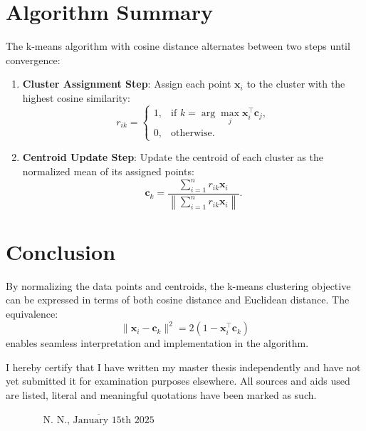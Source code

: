 \documentclass[12pt,twoside,a4paper,parskip]{scrbook} %
\def\BaAuthor{Bibin Babu}
\def\SubmitDate{January 15th 2025}
\def\ShowBaAuthor{\BaAuthor}
\def\ShowBaAuthor{N.~N.}
\begin{document}
\section*{Algorithm Summary}

The k-means algorithm with cosine distance alternates between two steps until convergence:

\begin{enumerate}
    \item \textbf{Cluster Assignment Step}: Assign each point \( \mathbf{x}_i \) to the cluster with the highest cosine similarity:
    \[
    r_{ik} =
    \begin{cases}
    1, & \text{if } k = \arg\max_{j} \mathbf{x}_i^\top \mathbf{c}_j, \\
    0, & \text{otherwise.}
    \end{cases}
    \]

    \item \textbf{Centroid Update Step}: Update the centroid of each cluster as the normalized mean of its assigned points:
    \[
    \mathbf{c}_k = \frac{\sum_{i=1}^{n} r_{ik} \mathbf{x}_i}{\left\| \sum_{i=1}^{n} r_{ik} \mathbf{x}_i \right\|}.
    \]
\end{enumerate}

\section*{Conclusion}

By normalizing the data points and centroids, the k-means clustering objective can be expressed in terms of both cosine distance and Euclidean distance. The equivalence:
\[
\|\mathbf{x}_i - \mathbf{c}_k\|^2 = 2(1 - \mathbf{x}_i^\top \mathbf{c}_k)
\]
enables seamless interpretation and implementation in the algorithm.

\cleardoublepage
{}
{}
\printbibliography


I hereby certify that I have written my master thesis independently and have not yet submitted it for examination purposes elsewhere. All sources and aids used are listed, literal and meaningful quotations have been marked as such.

\vspace{20pt}
\begin{flushright}
$\overline{~~~~~~~~~~~~~~~~~\mbox{\ShowBaAuthor, \SubmitDate}~~~~~~~~~~~~~~~~~}$
\end{flushright}
\end{document}
